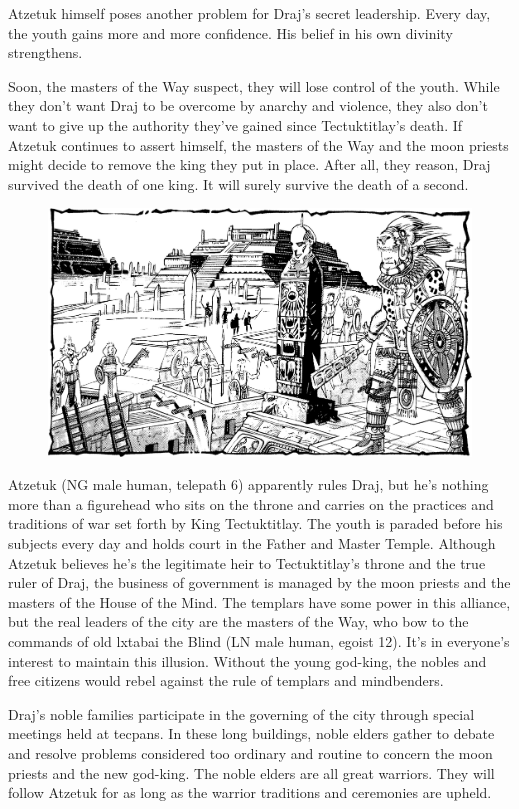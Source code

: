 {	Atzetuk himself poses another problem for Draj's secret leadership. Every day, the youth gains more and more confidence. His belief in his own divinity strengthens.

	Soon, the masters of the Way suspect, they will lose control of the youth. While they don't want Draj to be overcome by anarchy and violence, they also don't want to give up the authority they've gained since Tectuktitlay's death. If Atzetuk continues to assert himself, the masters of the Way and the moon priests might decide to remove the king they put in place. After all, they reason, Draj survived the death of one king. It will surely survive the death of a second.
}
{
\begin{figure}[b!]
\centering
\includegraphics[width=\textwidth]{images/draj-2.png}
\end{figure}

	Atzetuk (NG male human, telepath 6) apparently rules Draj, but he's nothing more than a figurehead who sits on the throne and carries on the practices and traditions of war set forth by King Tectuktitlay. The youth is paraded before his subjects every day and holds court in the Father and Master Temple. Although Atzetuk believes he's the legitimate heir to Tectuktitlay's throne and the true ruler of Draj, the business of government is managed by the moon priests and the masters of the House of the Mind. The templars have some power in this alliance, but the real leaders of the city are the masters of the Way, who bow to the commands of old lxtabai the Blind (LN male human, egoist 12). It's in everyone's interest to maintain this illusion. Without the young god-king, the nobles and free citizens would rebel against the rule of templars and mindbenders.

	Draj's noble families participate in the governing of the city through special meetings held at tecpans. In these long buildings, noble elders gather to debate and resolve problems considered too ordinary and routine to concern the moon priests and the new god-king. The noble elders are all great warriors. They will follow Atzetuk for as long as the warrior traditions and ceremonies are upheld.
}
